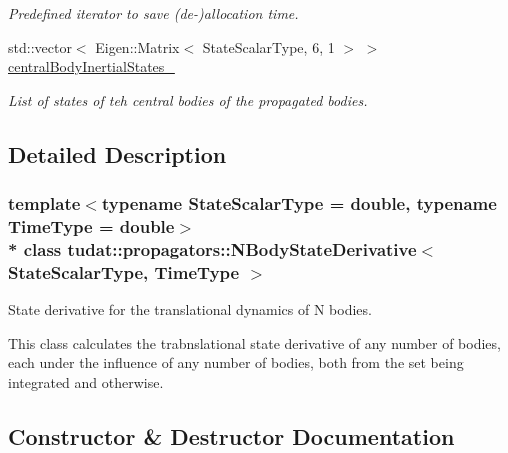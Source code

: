 \begin{DoxyCompactItemize}
\begin{DoxyCompactList}\small\item\em Predefined iterator to save (de-\/)allocation time. \end{DoxyCompactList}\item 
std\+::vector$<$ Eigen\+::\+Matrix$<$ State\+Scalar\+Type, 6, 1 $>$ $>$ \hyperlink{classtudat_1_1propagators_1_1NBodyStateDerivative_afc6bc65cd868409d374eb558f07770a4}{central\+Body\+Inertial\+States\+\_\+}\hypertarget{classtudat_1_1propagators_1_1NBodyStateDerivative_afc6bc65cd868409d374eb558f07770a4}{}\label{classtudat_1_1propagators_1_1NBodyStateDerivative_afc6bc65cd868409d374eb558f07770a4}

\begin{DoxyCompactList}\small\item\em List of states of teh central bodies of the propagated bodies. \end{DoxyCompactList}\end{DoxyCompactItemize}


\subsection{Detailed Description}
\subsubsection*{template$<$typename State\+Scalar\+Type = double, typename Time\+Type = double$>$\\*
class tudat\+::propagators\+::\+N\+Body\+State\+Derivative$<$ State\+Scalar\+Type, Time\+Type $>$}

State derivative for the translational dynamics of N bodies. 

This class calculates the trabnslational state derivative of any number of bodies, each under the influence of any number of bodies, both from the set being integrated and otherwise. 

\subsection{Constructor \& Destructor Documentation}
